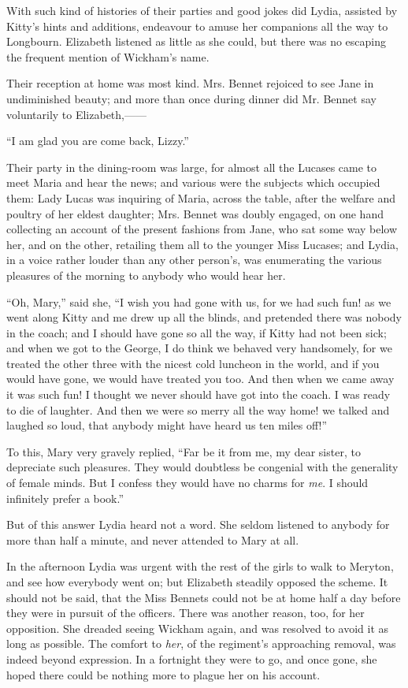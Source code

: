 With such kind of histories of their parties and good jokes did Lydia, assisted by Kitty's hints and additions, endeavour to amuse her companions all the way to Longbourn. Elizabeth listened as little as she could, but there was no escaping the frequent mention of Wickham's name.

Their reception at home was most kind. Mrs. Bennet rejoiced to see Jane in undiminished beauty; and more than once during dinner did Mr. Bennet say voluntarily to Elizabeth,------

``I am glad you are come back, Lizzy.''

Their party in the dining-room was large, for almost all the Lucases came to meet Maria and hear the news; and various were the subjects which occupied them: Lady Lucas was inquiring of Maria, across the table, after the welfare and poultry of her eldest daughter; Mrs. Bennet was doubly engaged, on one hand collecting an account of the present fashions from Jane, who sat some way below her, and on the other, retailing them all to the younger Miss Lucases; and Lydia, in a voice rather louder than any other person's, was enumerating the various pleasures of the morning to anybody who would hear her.

``Oh, Mary,'' said she, ``I wish you had gone with us, for we had such fun! as we went along Kitty and me drew up all the blinds, and pretended there was nobody in the coach; and I should have gone so all the way, if Kitty had not been sick; and when we got to the George, I do think we behaved very handsomely, for we treated the other three with the nicest cold luncheon in the world, and if you would have gone, we would have treated you too. And then when we came away it was such fun! I thought we never should have got into the coach. I was ready to die of laughter. And then we were so merry all the way home! we talked and laughed so loud, that anybody might have heard us ten miles off!''

To this, Mary very gravely replied, ``Far be it from me, my dear sister, to depreciate such pleasures. They would doubtless be congenial with the generality of female minds. But I confess they would have no charms for \textit{me}. I should infinitely prefer a book.''

But of this answer Lydia heard not a word. She seldom listened to anybody for more than half a minute, and never attended to Mary at all.

In the afternoon Lydia was urgent with the rest of the girls to walk to Meryton, and see how everybody went on; but Elizabeth steadily opposed the scheme. It should not be said, that the Miss Bennets could not be at home half a day before they were in pursuit of the officers. There was another reason, too, for her opposition. She dreaded seeing Wickham again, and was resolved to avoid it as long as possible. The comfort to \textit{her}, of the regiment's approaching removal, was indeed beyond expression. In a fortnight they were to go, and once gone, she hoped there could be nothing more to plague her on his account.

